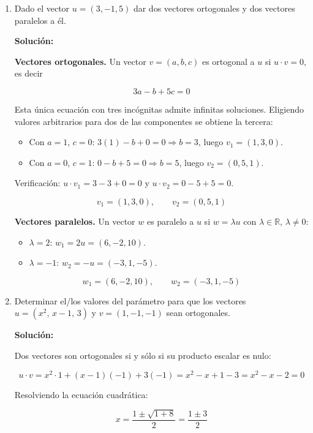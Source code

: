 \documentclass[12pt]{article}
\newcommand{\solucion}{%
    \vspace{0.8em}%
    \textbf{Solución:}%
    \vspace{0.8em}%
}
\begin{document}
\begin{enumerate}[label=\alph*.-]

    \item Dado el vector $u=(3,-1,5)$ dar dos vectores ortogonales y dos
    vectores paralelos a él.

    \solucion

    \textbf{Vectores ortogonales.} Un vector $v=(a,b,c)$ es ortogonal a $u$
    si $u\cdot v=0$, es decir

    \[
    3a-b+5c=0
    \]

    Esta única ecuación con tres incógnitas admite infinitas soluciones.
    Eligiendo valores arbitrarios para dos de las componentes se obtiene la
    tercera:

    \begin{itemize}
        \item Con $a=1$, $c=0$: $3(1)-b+0=0\Rightarrow b=3$, luego $v_1=(1,3,0)$.
        \item Con $a=0$, $c=1$: $0-b+5=0\Rightarrow b=5$, luego $v_2=(0,5,1)$.
    \end{itemize}

    Verificación: $u\cdot v_1=3-3+0=0$ y $u\cdot v_2=0-5+5=0$.

    \[
    \boxed{v_1=(1,3,0),\qquad v_2=(0,5,1)}
    \]

    \textbf{Vectores paralelos.} Un vector $w$ es paralelo a $u$ si
    $w=\lambda u$ con $\lambda\in\mathbb{R}$, $\lambda\neq0$:

    \begin{itemize}
        \item $\lambda=2$: $w_1=2u=(6,-2,10)$.
        \item $\lambda=-1$: $w_2=-u=(-3,1,-5)$.
    \end{itemize}

    \[
    \boxed{w_1=(6,-2,10),\qquad w_2=(-3,1,-5)}
    \]

    \item Determinar el/los valores del parámetro para que los vectores
    $u=(x^2,\,x-1,\,3)$ y $v=(1,-1,-1)$ sean ortogonales.

    \solucion

    Dos vectores son ortogonales si y sólo si su producto escalar es nulo:

    \[
    u\cdot v=x^2\cdot1+(x-1)(-1)+3(-1)=x^2-x+1-3=x^2-x-2=0
    \]

    Resolviendo la ecuación cuadrática:

    \[
    x=\frac{1\pm\sqrt{1+8}}{2}=\frac{1\pm3}{2}
    \]


\end{enumerate}
\end{document}
